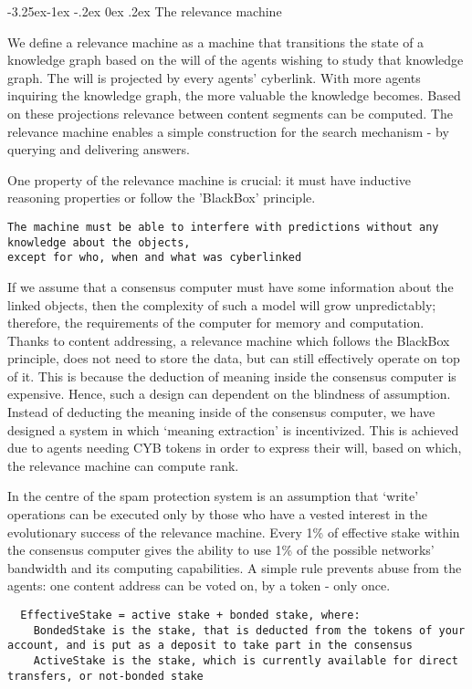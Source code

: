 \documentclass[8pt,oneside]{amsart}
\makeatletter
\renewcommand\subsection{\@startsection{subsection}{2}{\z@}%
                                     {-3.25ex\@plus -1ex \@minus -.2ex}%
                                     {0ex \@plus .2ex}%
                                     {\play\Large}}%
\newcommand{\titleSection}[1]{\subsection{#1}}
\makeatother
\begin{document}
\begin{Abstract}
\titleSection{The relevance machine}\label{The relevance-machine}

We define a relevance machine as a machine that transitions the state of a knowledge graph based on the will of the agents wishing to study that knowledge graph. The will is projected by every agents' cyberlink. With more agents inquiring the knowledge graph, the more valuable the knowledge becomes. Based on these projections relevance between content segments can be computed. The relevance machine enables a simple construction for the search mechanism - by querying and delivering answers.

One property of the relevance machine is crucial: it must have inductive reasoning properties or follow the 'BlackBox' principle.

\begin{lstlisting}
The machine must be able to interfere with predictions without any knowledge about the objects,
except for who, when and what was cyberlinked
\end{lstlisting}

If we assume that a consensus computer must have some information about the linked objects, then the complexity of such a model will grow unpredictably; therefore, the requirements of the computer for memory and computation. Thanks to content addressing, a relevance machine which follows the BlackBox principle, does not need to store the data, but can still effectively operate on top of it. This is because the deduction of meaning inside the consensus computer is expensive. Hence, such a design can dependent on the blindness of assumption. Instead of deducting the meaning inside of the consensus computer, we have designed a system in which ‘meaning extraction’ is incentivized. This is achieved due to agents needing CYB tokens in order to express their will, based on which, the relevance machine can compute rank.

In the centre of the spam protection system is an assumption that ‘write’ operations can be executed only by those who have a vested interest in the evolutionary success of the relevance machine. Every 1\% of effective stake within the consensus computer gives the ability to use 1\% of the possible networks' bandwidth and its computing capabilities. A simple rule prevents abuse from the agents: one content address can be voted on, by a token - only once.

\begin{lstlisting}
  EffectiveStake = active stake + bonded stake, where:
    BondedStake is the stake, that is deducted from the tokens of your account, and is put as a deposit to take part in the consensus
    ActiveStake is the stake, which is currently available for direct transfers, or not-bonded stake
\end{lstlisting}


\end{Abstract}
\end{document}
